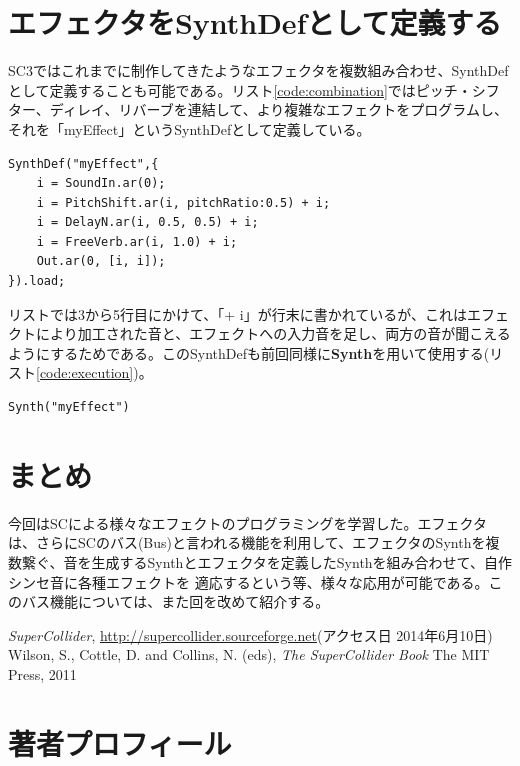 \documentclass{jsarticle}
\begin{document}
\section{エフェクタをSynthDefとして定義する}
SC3ではこれまでに制作してきたようなエフェクタを複数組み合わせ、SynthDefとして定義することも可能である。リスト\ref{code:combination}ではピッチ・シフター、ディレイ、リバーブを連結して、より複雑なエフェクトをプログラムし、それを「myEffect」というSynthDefとして定義している。

\begin{lstlisting}[caption=エフェクトのSynthDef, label=code:combination]
SynthDef("myEffect",{
	i = SoundIn.ar(0);
	i = PitchShift.ar(i, pitchRatio:0.5) + i;
	i = DelayN.ar(i, 0.5, 0.5) + i;
	i = FreeVerb.ar(i, 1.0) + i;
	Out.ar(0, [i, i]);
}).load;
\end{lstlisting}

リストでは3から5行目にかけて、「+ i」が行末に書かれているが、これはエフェクトにより加工された音と、エフェクトへの入力音を足し、両方の音が聞こえるようにするためである。このSynthDefも前回同様に{\bf Synth}を用いて使用する(リスト\ref{code:execution})。

\begin{lstlisting}[caption=SynthDef「"myEffect"」の使用, label=code:execution]
Synth("myEffect")
\end{lstlisting}

\section{まとめ}
今回はSCによる様々なエフェクトのプログラミングを学習した。エフェクタは、さらにSCのバス(Bus)と言われる機能を利用して、エフェクタのSynthを複数繋ぐ、音を生成するSynthとエフェクタを定義したSynthを組み合わせて、自作シンセ音に各種エフェクトを
適応するという等、様々な応用が可能である。このバス機能については、また回を改めて紹介する。


\begin{thebibliography}{citations}
   {\it SuperCollider}, \url{http://supercollider.sourceforge.net}(アクセス日 2014年6月10日)
   Wilson, S., Cottle, D. and Collins, N. (eds), {\it The SuperCollider Book} The MIT Press, 2011

\end{thebibliography}

\section{著者プロフィール}
\end{document}
